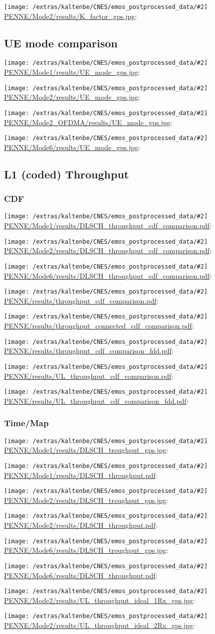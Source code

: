 \documentclass[a4paper,10pt]{article}
\newcommand{\printfile}[2][]{
 \begin{minipage}{8cm}
  \centering
  \texttt{[image: /extras/kaltenbe/CNES/emos\_postprocessed\_data/\#2]}
  \url{#2}: #1

 \end{minipage}
}
\begin{document}
\printfile{PENNE/Mode2/results/K_factor_gps.jpg}

\subsection{UE mode comparison}

\printfile{PENNE/Mode1/results/UE_mode_gps.jpg}
\printfile{PENNE/Mode2/results/UE_mode_gps.jpg}

\printfile{PENNE/Mode2_OFDMA/results/UE_mode_gps.jpg}
\printfile{PENNE/Mode6/results/UE_mode_gps.jpg}

\subsection{L1 (coded) Throughput}


\subsubsection{CDF}

\printfile{PENNE/Mode1/results/DLSCH_throughput_cdf_comparison.pdf}
\printfile{PENNE/Mode2/results/DLSCH_throughput_cdf_comparison.pdf}

\printfile{PENNE/Mode6/results/DLSCH_throughput_cdf_comparison.pdf}

\printfile{PENNE/results/throughput_cdf_comparison.pdf}
\printfile{PENNE/results/throughput_connected_cdf_comparison.pdf}

\printfile{PENNE/results/throughput_cdf_comparison_fdd.pdf}

\printfile{PENNE/results/UL_throughput_cdf_comparison.pdf}
\printfile{PENNE/results/UL_throughput_cdf_comparison_fdd.pdf}

\subsubsection{Time/Map}

\printfile{PENNE/Mode1/results/DLSCH_troughput_gps.jpg}
\printfile{PENNE/Mode1/results/DLSCH_throughput.pdf}

\printfile{PENNE/Mode2/results/DLSCH_troughput_gps.jpg}
\printfile{PENNE/Mode2/results/DLSCH_throughput.pdf}

\printfile{PENNE/Mode6/results/DLSCH_troughput_gps.jpg}
\printfile{PENNE/Mode6/results/DLSCH_throughput.pdf}

\printfile{PENNE/Mode2/results/UL_throughput_ideal_1Rx_gps.jpg}
\printfile{PENNE/Mode2/results/UL_throughput_ideal_2Rx_gps.jpg}
\end{document}
